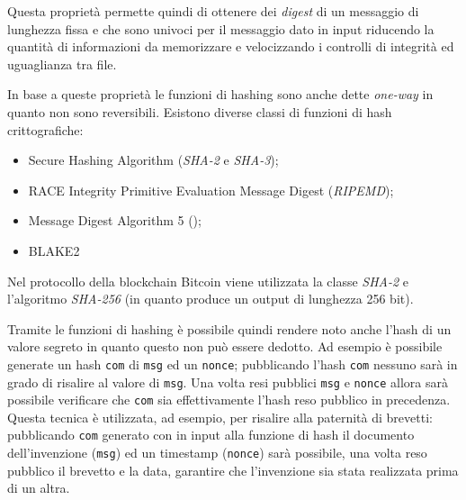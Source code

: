 Questa proprietà permette quindi di ottenere dei \textit{digest} di un messaggio di lunghezza fissa e che sono univoci per il messaggio dato in input riducendo la quantità di informazioni da memorizzare e velocizzando i controlli di integrità ed uguaglianza tra file.

In base a queste proprietà le funzioni di hashing sono anche dette \textit{one-way} in quanto non sono reversibili.\newline\newline
Esistono diverse classi di funzioni di hash crittografiche:
\begin{itemize}
    \item Secure Hashing Algorithm (\textit{SHA-2} e \textit{SHA-3});
    \item RACE Integrity Primitive  Evaluation Message Digest (\textit{RIPEMD});
    \item Message Digest Algorithm 5 ();
    \item BLAKE2
\end{itemize}

Nel protocollo della blockchain Bitcoin viene utilizzata la classe \textit{SHA-2} e l'algoritmo \textit{SHA-256} (in quanto produce un output di lunghezza 256 bit).
\begin{table}
    \caption{Confronto tra \textit{SHA-256} di due stringhe simili}
    \centering
\end{table}
Tramite le funzioni di hashing è possibile quindi rendere noto anche l'hash di un valore segreto in quanto questo non può essere dedotto. Ad esempio è possibile generate un hash \texttt{com} di \texttt{msg} ed un \texttt{nonce}; pubblicando l'hash \texttt{com} nessuno sarà in grado di risalire al valore di \texttt{msg}. Una volta resi pubblici \texttt{msg} e \texttt{nonce} allora sarà possibile verificare che \texttt{com} sia effettivamente l'hash reso pubblico in precedenza.\newline
Questa tecnica è utilizzata, ad esempio, per risalire alla paternità di brevetti: pubblicando \texttt{com} generato con in input alla funzione di hash il documento dell'invenzione (\texttt{msg}) ed un timestamp (\texttt{nonce}) sarà possibile, una volta reso pubblico il brevetto e la data, garantire che l'invenzione sia stata realizzata prima di un altra.

